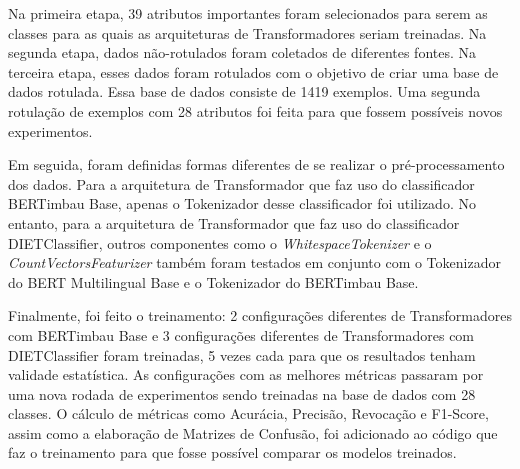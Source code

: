 Na primeira etapa, 39 atributos importantes foram selecionados para serem as classes para as quais as arquiteturas de Transformadores seriam treinadas. Na segunda etapa, dados não-rotulados foram coletados de diferentes fontes. Na terceira etapa, esses dados foram rotulados com o objetivo de criar uma base de dados rotulada. Essa base de dados consiste de 1419 exemplos. Uma segunda rotulação de exemplos com 28 atributos foi feita para que fossem possíveis novos experimentos.

Em seguida, foram definidas formas diferentes de se realizar o pré-processamento dos dados. Para a arquitetura de Transformador que faz uso do classificador BERTimbau Base, apenas o Tokenizador desse classificador foi utilizado. No entanto, para a arquitetura de Transformador que faz uso do classificador DIETClassifier, outros componentes como o \textit{WhitespaceTokenizer} e o \textit{CountVectorsFeaturizer} também foram testados em conjunto com o Tokenizador do BERT Multilingual Base e o Tokenizador do BERTimbau Base.

Finalmente, foi feito o treinamento: 2 configurações diferentes de Transformadores com BERTimbau Base e 3 configurações diferentes de Transformadores com DIETClassifier foram treinadas, 5 vezes cada para que os resultados tenham validade estatística. As configurações com as melhores métricas passaram por uma nova rodada de experimentos sendo treinadas na base de dados com 28 classes. O cálculo de métricas como Acurácia, Precisão, Revocação e F1-Score, assim como a elaboração de Matrizes de Confusão, foi adicionado ao código que faz o treinamento para que fosse possível comparar os modelos treinados.

